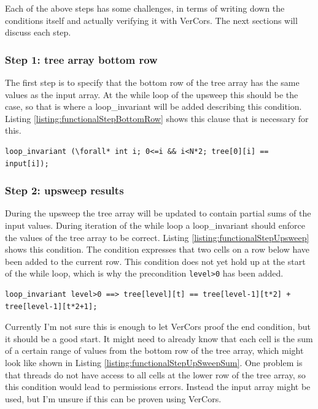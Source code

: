 \documentclass[a4paper]{article}
\newcommand{\code}[1]{\texttt{\small \color{inline}#1}} %
\begin{document}
Each of the above steps has some challenges, in terms of writing down the conditions itself and actually verifying it with VerCors. The next sections will discuss each step.

\subsubsection{Step 1: tree array bottom row}
The first step is to specify that the bottom row of the tree array has the same values as the input array. At the while loop of the upsweep this should be the case, so that is where a loop\_invariant will be added describing this condition. Listing \ref{listing:functionalStepBottomRow} shows this clause that is necessary for this.

\begin{lstlisting}[caption=Bottom row of the tree array is equal to the input array, label=listing:functionalStepBottomRow, float=htpb]
loop_invariant (\forall* int i; 0<=i && i<N*2; tree[0][i] == input[i]);
\end{lstlisting}

\subsubsection{Step 2: upsweep results}
During the upsweep the tree array will be updated to contain partial sums of the input values. During iteration of the while loop a loop\_invariant should enforce the values of the tree array to be correct. Listing \ref{listing:functionalStepUpsweep} shows this condition. The condition expresses that two cells on a row below have been added to the current row. This condition does not yet hold up at the start of the while loop, which is why the precondition \code{level>0} has been added.

\begin{lstlisting}[caption=Upsweep loop\_invariant enforcing the results of the computation, label=listing:functionalStepUpsweep, float=htpb]
loop_invariant level>0 ==> tree[level][t] == tree[level-1][t*2] + tree[level-1][t*2+1];
\end{lstlisting}

Currently I'm not sure this is enough to let VerCors proof the end condition, but it should be a good start. It might need to already know that each cell is the sum of a certain range of values from the bottom row of the tree array, which might look like shown in Listing \ref{listing:functionalStepUpSweepSum}. One problem is that threads do not have access to all cells at the lower row of the tree array, so this condition would lead to permissions errors. Instead the input array might be used, but I'm unsure if this can be proven using VerCors. 
\end{document}
